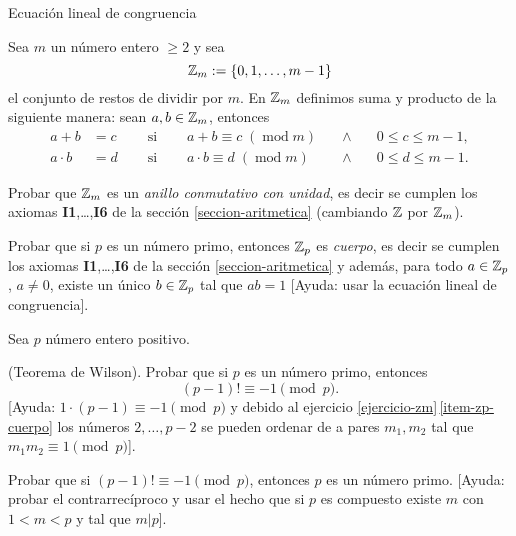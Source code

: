 \begin{section}{Ecuación lineal de congruencia}
\begin{enumex}
    \item\label{ejercicio-zm}  Sea $m$ un número entero $\ge 2$ y sea
    $$
    {\mathbb Z}_m := \{0,1,\ldots, m-1\}
    $$
    el conjunto de restos de dividir por $m$. En ${\mathbb Z}_m$ definimos suma y producto de la siguiente manera: sean $a,b \in {\mathbb Z}_m$,  entonces  
    \begin{equation*}
        \begin{array}{llllll}
            a+b &= c\quad &\text{ si }\quad &a+b \equiv c \; (\operatorname{mod}m) \quad&\wedge\quad&0 \le c \le m-1,\\
            a \cdot b &= d\quad &\text{ si }\quad &a\cdot b \equiv d \; (\operatorname{mod}m) &\wedge& 0 \le d \le m-1.
        \end{array} 
    \end{equation*}
    \begin{enumex}
        \item Probar que ${\mathbb Z}_m$ es un  \textit{anillo conmutativo con unidad},  es decir se cumplen los axiomas \textbf{I1},\ldots,\textbf{I6} de la sección \ref{seccion-aritmetica} (cambiando ${\mathbb Z}$ por  ${\mathbb Z}_m$). 
        \item\label{item-zp-cuerpo} Probar que si $p$ es un número primo,  entonces ${\mathbb Z}_p$ es \textit{cuerpo}, es decir  se cumplen los axiomas \textbf{I1},\ldots,\textbf{I6} de la sección \ref{seccion-aritmetica} y además, para todo $a \in {\mathbb Z}_p$, $a\ne 0$, existe un único $b \in {\mathbb Z}_p$ tal que $ab =1$ [Ayuda: usar la ecuación lineal de congruencia]. 
    \end{enumex}

    \item  Sea $p$ número entero positivo.
    \begin{enumex} 
        \item (Teorema de Wilson). Probar que si $p$ es un número primo,  entonces 
        $$(p-1)! \equiv -1 \pmod{p}.
        $$
        [Ayuda: $1 \cdot (p-1) \equiv -1 \pmod{p}$ y  debido al ejercicio \ref{ejercicio-zm}\,\ref{item-zp-cuerpo} los números $2, \ldots, p-2$ se pueden ordenar de a pares $m_1, m_2$ tal que $m_1m_2 \equiv 1 \pmod{p}$].
        \item Probar que si $(p-1)! \equiv -1 \pmod{p}$,  entonces $p$  es un número primo. [Ayuda: probar el contrarrecíproco y usar el hecho que si $p$  es compuesto  existe $m$ con $1 < m < p$ y  tal que $m|p$].
    \end{enumex}
\end{enumex}

\end{section}



